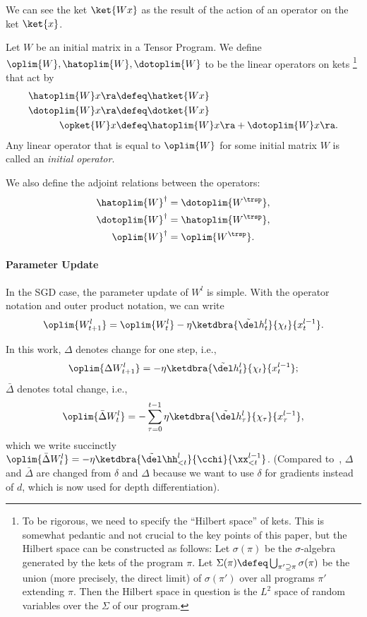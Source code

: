 We can see the ket $\ket{W x}$ as the result of the action of an operator on the ket $\ket{x}$.
\begin{defn}\label{defn:oplim}
  Let $W$ be an initial matrix in a Tensor Program.
  We define $\oplim{W}, \hatoplim{W}, \dotoplim{W}$ to be the linear operators on kets
  \footnote{\label{footnote:hilbertspace}
    To be rigorous, we need to specify the ``Hilbert space'' of kets.
    This is somewhat pedantic and not crucial to the key points of this paper, but the Hilbert space can be constructed as follows:
    Let $\sigma(\pi)$ be the $\sigma$-algebra generated by the kets of the program $\pi$.
    Let $\Sigma(\pi) \defeq \bigcup_{\pi' \supseteq \pi} \sigma(\pi)$ be the union (more precisely, the direct limit) of $\sigma(\pi')$ over all programs $\pi'$ extending $\pi$.
    Then the Hilbert space in question is the $L^2$ space of random variables over the $\Sigma$ of our program.
    }
  that act by 
  \begin{align*}
      \hatoplim{W} x \ra &\defeq \hatket{Wx}\\
      \dotoplim{W} x \ra &\defeq \dotket{Wx}\\
      \opket{W} x &\defeq \hatoplim{W} x \ra + \dotoplim{W} x \ra.
  \end{align*}
  Any linear operator that is equal to $\oplim{W}$ for some initial matrix $W$ is called an \emph{initial operator}.
\end{defn}

We also define the adjoint relations between the operators:
\begin{align*}
    \hatoplim{W}^\dagger &= \dotoplim{W^\trsp},\\
    \dotoplim{W}^\dagger &= \hatoplim{W^\trsp},\\
    \oplim{W}^\dagger &= \oplim{W^\trsp}.
\end{align*}

\paragraph{Parameter Update}

In the SGD case, the parameter update of $W^l$ is simple. With the operator notation and outer product notation, we can write
\[\oplim{W_{t+1}^l}=\oplim{W_t^l}-\eta \ketdbra{\tilde \del h^l_t}{\chi_t}{x^{l-1}_t}. \]

In this work, $\Delta$ denotes change for one step, i.e., \[\oplim{\Delta W_{t+1}^l}=-\eta \ketdbra{\tilde \del h^l_t}{\chi_t}{x^{l-1}_t};\] $\bar \Delta$ denotes total change, i.e., \[
\oplim{\bar \Delta W_t^l} =-\sum_{\tau=0}^{t-1}\eta \ketdbra{\tilde \del h^l_\tau}{\chi_\tau}{x^{l-1}_\tau}, 
\] which we write succinctly $\oplim{\bar \Delta W_t^l}=-\eta \ketdbra{\tilde \del \hh^l_{<t}}{\cchi}{\xx^{l-1}_{<t}}$. (Compared to~\citet{yang2023tensor}, $\Delta$ and $\bar\Delta$ are changed from $\delta$ and $\Delta$ because we want to use $\delta$ for gradients instead of $d$, which is now used for depth differentiation).

